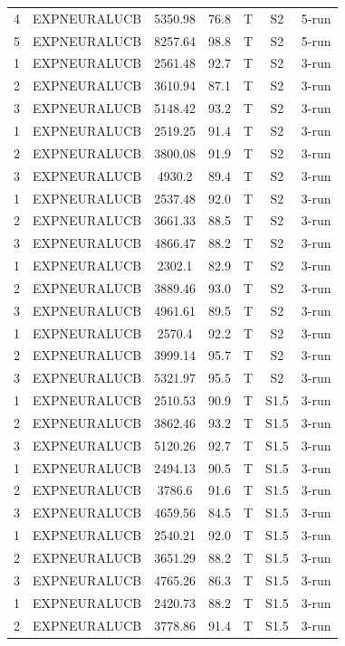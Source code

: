 \documentclass[11pt]{article}
\begin{document}
\begin{center}
\begin{longtable}{|c|c|c|c|c|c|c|}
4 & EXPNEURALUCB & 5350.98 & 76.8 & T & S2 & 5-run \\
5 & EXPNEURALUCB & 8257.64 & 98.8 & T & S2 & 5-run \\
1 & EXPNEURALUCB & 2561.48 & 92.7 & T & S2 & 3-run \\
2 & EXPNEURALUCB & 3610.94 & 87.1 & T & S2 & 3-run \\
3 & EXPNEURALUCB & 5148.42 & 93.2 & T & S2 & 3-run \\
1 & EXPNEURALUCB & 2519.25 & 91.4 & T & S2 & 3-run \\
2 & EXPNEURALUCB & 3800.08 & 91.9 & T & S2 & 3-run \\
3 & EXPNEURALUCB & 4930.2 & 89.4 & T & S2 & 3-run \\
1 & EXPNEURALUCB & 2537.48 & 92.0 & T & S2 & 3-run \\
2 & EXPNEURALUCB & 3661.33 & 88.5 & T & S2 & 3-run \\
3 & EXPNEURALUCB & 4866.47 & 88.2 & T & S2 & 3-run \\
1 & EXPNEURALUCB & 2302.1 & 82.9 & T & S2 & 3-run \\
2 & EXPNEURALUCB & 3889.46 & 93.0 & T & S2 & 3-run \\
3 & EXPNEURALUCB & 4961.61 & 89.5 & T & S2 & 3-run \\
1 & EXPNEURALUCB & 2570.4 & 92.2 & T & S2 & 3-run \\
2 & EXPNEURALUCB & 3999.14 & 95.7 & T & S2 & 3-run \\
3 & EXPNEURALUCB & 5321.97 & 95.5 & T & S2 & 3-run \\
1 & EXPNEURALUCB & 2510.53 & 90.9 & T & S1.5 & 3-run \\
2 & EXPNEURALUCB & 3862.46 & 93.2 & T & S1.5 & 3-run \\
3 & EXPNEURALUCB & 5120.26 & 92.7 & T & S1.5 & 3-run \\
1 & EXPNEURALUCB & 2494.13 & 90.5 & T & S1.5 & 3-run \\
2 & EXPNEURALUCB & 3786.6 & 91.6 & T & S1.5 & 3-run \\
3 & EXPNEURALUCB & 4659.56 & 84.5 & T & S1.5 & 3-run \\
1 & EXPNEURALUCB & 2540.21 & 92.0 & T & S1.5 & 3-run \\
2 & EXPNEURALUCB & 3651.29 & 88.2 & T & S1.5 & 3-run \\
3 & EXPNEURALUCB & 4765.26 & 86.3 & T & S1.5 & 3-run \\
1 & EXPNEURALUCB & 2420.73 & 88.2 & T & S1.5 & 3-run \\
2 & EXPNEURALUCB & 3778.86 & 91.4 & T & S1.5 & 3-run \\

\end{longtable}
\end{center}
\end{document}
